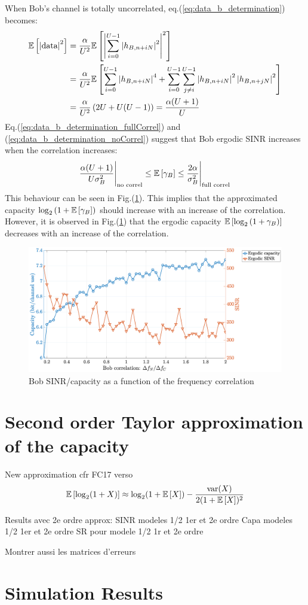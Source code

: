 \documentclass[12pt]{article}
\begin{document}
When Bob's channel is totally uncorrelated, eq.(\ref{eq:data_b_determination}) becomes:
\begin{equation}
\begin{split}
\mathbb{E} \left[\left| \text{data}\right|^2\right] &=  \frac{\alpha}{U^2} \mathbb{E} \left[\left|\sum_{i=0}^{U-1} \left|h_{B,n+iN}\right|^2\right|^2\right] \\
&=  \frac{\alpha}{U^2} \mathbb{E} \left[\sum_{i=0}^{U-1} \left|h_{B,n+iN}\right|^4  + \sum_{i=0}^{U-1}\sum_{j \neq i}^{U-1} \left|h_{B,n+iN}\right|^2  \left|h_{B,n+jN}\right|^2 \right] \\
&=  \frac{\alpha}{U^2} \left(2U + U(U-1) \right)= \frac{\alpha(U+1)}{U}
\label{eq:data_b_determination_noCorrel}
\end{split}
\end{equation}
Eq.(\ref{eq:data_b_determination_fullCorrel}) and (\ref{eq:data_b_determination_noCorrel}) suggest that Bob ergodic SINR increases when the correlation increases:
\begin{equation}
	\frac{\alpha(U+1)}{U \sigma_B^2}\Bigg|_{\text{no correl}} \leq \mathbb{E} \left[\gamma_B\right] \leq \frac{2\alpha}{\sigma_B^2}\Bigg|_{\text{full correl}}
\end{equation}
This behaviour can be seen in Fig.(\ref{fig:sinr_capa_variableCorrelB}). This implies that the approximated capacity $\log_2{(1+\mathbb{E} \left[\gamma_B\right])}$ should increase with an increase of the correlation. However, it is observed in Fig.(\ref{fig:sinr_capa_variableCorrelB}) that the ergodic capacity $\mathbb{E} \left[\log_2{(1+\gamma_B)}\right]$ decreases with an increase of the correlation.
\begin{figure}[htb!]
	\centering
	\includegraphics[width=.75\linewidth]{img/SINR_capa_variableCorrelB.eps}
	\caption{Bob SINR/capacity as a function of the frequency  correlation}
	\label{fig:sinr_capa_variableCorrelB}
\end{figure}






\section{Second order Taylor approximation of the capacity}
New approximation cfr FC17 verso
\begin{equation}
	\mathbb{E} \left[\log_2(1+X)\right] \approx \log_2(1+\mathbb{E} \left[X\right]) - \frac{\text{var}(X)}{2(1+\mathbb{E} \left[X\right])^2}
	\label{eq:second_order_approx}
\end{equation}


Results avec 2e ordre approx:
SINR modeles 1/2 1er et 2e ordre
Capa modeles 1/2 1er et 2e ordre
SR pour modele 1/2 1r et 2e ordre


Montrer aussi les matrices d'erreurs\\



\section{Simulation Results}
\end{document}
